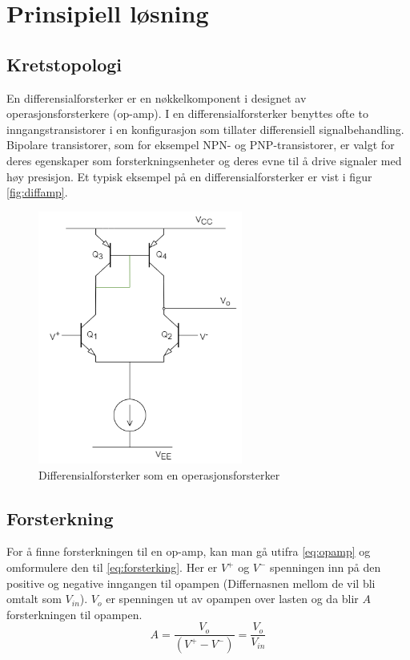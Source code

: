 \newpage
\section{Prinsipiell løsning}
\label{prinsipiellLoesning}

\subsection{Kretstopologi}
\label{kretstopologi}

En differensialforsterker er en nøkkelkomponent i designet av operasjonsforsterkere (op-amp)\cite[s. 105]{Art of Eletronics}. I en differensialforsterker benyttes ofte to inngangstransistorer i en konfigurasjon som tillater differensiell signalbehandling. Bipolare transistorer, som for eksempel NPN- og PNP-transistorer, er valgt for deres egenskaper som forsterkningsenheter og deres evne til å drive signaler med høy presisjon. Et typisk eksempel på en differensialforsterker er vist i figur \autoref{fig:diffamp}.

\begin{figure}[h]
    \centering
    \includegraphics[width=0.6\textwidth]{Bilder/diffamp.drawio.png}
    \caption{Differensialforsterker som en operasjonsforsterker}
    \label{fig:diffamp}
\end{figure}


\subsection{Forsterkning}
\label{forsterkning}
For å finne forsterkningen til en op-amp, kan man gå utifra \autoref{eq:opamp} og omformulere den til \autoref{eq:forsterking}. Her er $V^+$ og $V^-$ spenningen inn på den positive og negative inngangen til opampen (Differnasnen mellom de vil bli omtalt som $V_{in}$). $V_{o}$ er spenningen ut av opampen over lasten og da blir $A$ forsterkningen til opampen.
\begin{equation}
    A = \frac{V_{o}}{(V^+ - V^-)} = \frac{V_{o}}{V_{in}}
    \label{eq:forsterking}
\end{equation}



